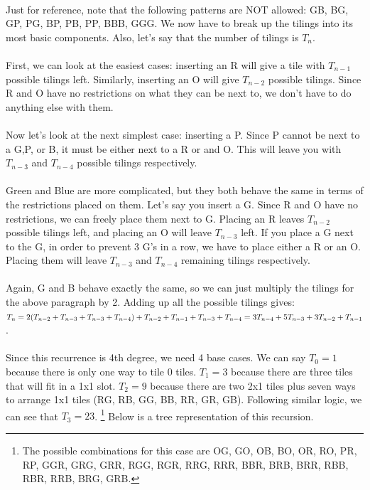 \documentclass[11pt]{article}
\begin{document}
\begin{solution}
	\\   Just for reference, note that the following patterns are NOT allowed: GB, BG, GP, PG, BP, PB, PP, BBB, GGG. We now have to break up the tilings into its most basic components. Also, let's say that the number of tilings is $T_n$. 
	\\\\ First, we can look at the easiest cases: inserting an R will give a tile with $T_{n-1}$ possible tilings left. Similarly, inserting an O will give $T_{n-2}$ possible tilings. Since R and O have no restrictions on what they can be next to, we don't have to do anything else with them. 
	\\\\ Now let's look at the next simplest case: inserting a P. Since P cannot be next to a G,P, or B, it must be either next to a R or and O. This will leave you with $T_{n-3}$ and $T_{n-4}$ possible tilings respectively. 
	\\\\ Green and Blue are more complicated, but they both behave the same in terms of the restrictions placed on them. Let's say you insert a G. Since R and O have no restrictions, we can freely place them next to G. Placing an R leaves $T_{n-2}$ possible tilings left, and placing an O will leave $T_{n-3}$ left. If you place a G next to the G, in order to prevent 3 G's in a row, we have to place either a R or an O. Placing them will leave $T_{n-3}$ and $T_{n-4}$ remaining tilings respectively. 
	\\\\ Again, G and B behave exactly the same, so we can just multiply the tilings for the above paragraph by 2. Adding up all the possible tilings gives: \\ $T_n = 2(T_{n-2} + T_{n-3} + T_{n-3} + T_{n-4}) + T_{n-2} + T_{n-1} + T_{n-3} + T_{n-4} \\ =  3T_{n-4} + 5T_{n-3} + 3T_{n-2} + T_{n-1}$.
	\\\\ Since this recurrence is 4th degree, we need 4 base cases. We can say $T_0 = 1$ because there is only one way to tile 0 tiles. $T_1 = 3$ because there are three tiles that will fit in a 1x1 slot. $T_2 = 9$ because there are two 2x1 tiles plus seven ways to arrange 1x1 tiles (RG, RB, GG, BB, RR, GR, GB). Following similar logic, we can see that $T_3 = 23$. \footnote[1]{The possible combinations for this case are OG, GO, OB, BO, OR, RO, PR, RP, GGR, GRG, GRR, RGG, RGR, RRG, RRR, BBR, BRB, BRR, RBB, RBR, RRB, BRG, GRB.} Below is a tree representation of this recursion.

\end{solution}
\end{document}
